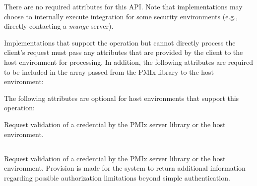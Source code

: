 \reqattrstart
There are no required attributes for this \ac{API}. Note that implementations may choose to internally
execute integration for some security environments (e.g., directly
contacting a \textit{munge} server).

Implementations that support the operation but cannot directly process the client's request must pass any attributes that are provided by the client to the host environment for processing. In addition, the following attributes are required to be included in the  array passed from the \ac{PMIx} library to the host environment:


\reqattrend

\optattrstart
The following attributes are optional for host environments that support this operation:


\optattrend

\descr

Request validation of a credential by the \ac{PMIx} server library or the host environment.


\subsection{}

\summary

Request validation of a credential by the \ac{PMIx} server library or the host environment. Provision is made for the system to return additional information regarding possible authorization limitations beyond simple authentication.

\format


\begin{arglist}
\end{arglist}

